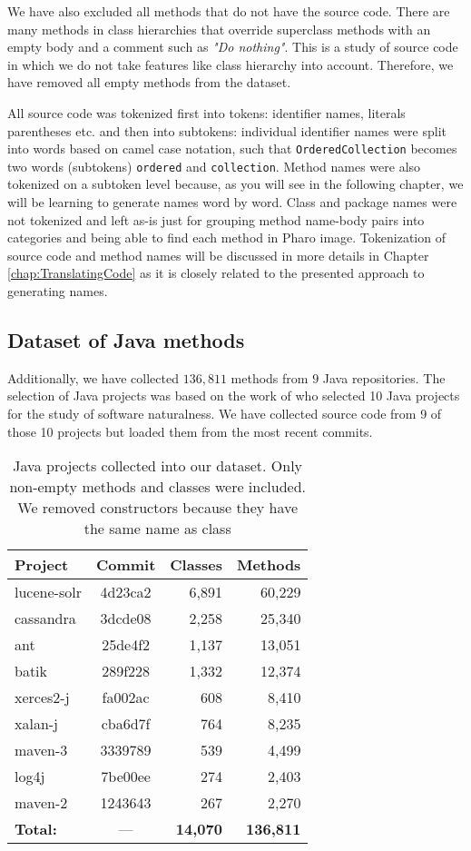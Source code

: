 We have also excluded all methods that do not have the source code. There are many methods in class hierarchies that override superclass methods with an empty body and a comment such as \textit{"Do nothing"}. This is a study of source code in which we do not take features like class hierarchy into account. Therefore, we have removed all empty methods from the dataset.

All source code was tokenized first into tokens: identifier names, literals parentheses etc. and then into subtokens: individual identifier names were split into words based on camel case notation, such that \texttt{OrderedCollection} becomes two words (subtokens) \texttt{ordered} and \texttt{collection}. Method names were also tokenized on a subtoken level because, as you will see in the following chapter, we will be learning to generate names word by word. Class and package names were not tokenized and left as-is just for grouping method name-body pairs into categories and being able to find each method in Pharo image. Tokenization of source code and method names will be discussed in more details in Chapter \ref{chap:TranslatingCode} as it is closely related to the presented approach to generating names.

\subsection{Dataset of Java methods}
\label{sec:Naturalness-DataJava}

Additionally, we have collected $136,811$ methods from $9$ Java repositories. The selection of Java projects was based on the work of \cite{Hind12} who selected 10 Java projects for the study of software naturalness. We have collected source code from 9 of those 10 projects but loaded them from the most recent commits.

\begin{table}[H]
\centering
\begin{tabular}{|l|c|r|r|}
\hline
\textbf{Project} & \textbf{Commit} & \textbf{Classes} & \textbf{Methods} \\
\hline
lucene-solr & 4d23ca2 & 6,891  & 60,229 \\
cassandra   & 3dcde08 & 2,258  & 25,340 \\
ant         & 25de4f2 & 1,137  & 13,051 \\
batik       & 289f228 & 1,332  & 12,374 \\
xerces2-j   & fa002ac & 608    & 8,410 \\
xalan-j     & cba6d7f & 764    & 8,235 \\
maven-3     & 3339789 & 539    & 4,499 \\
log4j       & 7be00ee & 274    & 2,403 \\
maven-2     & 1243643 & 267    & 2,270 \\
\hline
\textbf{Total:}       & ---     & \textbf{14,070} & \textbf{136,811} \\
\hline
\end{tabular}
\caption{Java projects collected into our dataset. Only non-empty methods and classes were included. We removed constructors because they have the same name as class}
\label{tab:Naturalness-DataJava}
\end{table}

